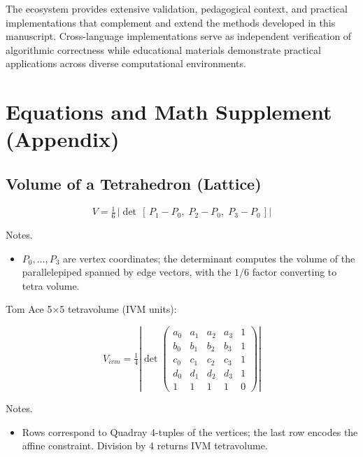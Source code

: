 \documentclass[
  10pt,
]{article}
\providecommand{\tightlist}{%
  \setlength{\itemsep}{0pt}\setlength{\parskip}{0pt}}
\begin{document}
The ecosystem provides extensive validation, pedagogical context, and
practical implementations that complement and extend the methods
developed in this manuscript. Cross-language implementations serve as
independent verification of algorithmic correctness while educational
materials demonstrate practical applications across diverse
computational environments. 

\hypertarget{equations-and-math-supplement-appendix}{%
\section{Equations and Math Supplement
(Appendix)}\label{equations-and-math-supplement-appendix}}

\hypertarget{volume-of-a-tetrahedron-lattice}{%
\subsection{Volume of a Tetrahedron
(Lattice)}\label{volume-of-a-tetrahedron-lattice}}

\begin{equation}\label{eq:supp_lattice_det}
V = \tfrac{1}{6}\,\left|\det\,[\,P_1 - P_0,\; P_2 - P_0,\; P_3 - P_0\,]\right|
\end{equation}

Notes.

\begin{itemize}
\tightlist
\item
  \(P_0,\ldots,P_3\) are vertex coordinates; the determinant computes
  the volume of the parallelepiped spanned by edge vectors, with the
  \(1/6\) factor converting to tetra volume.
\end{itemize}

Tom Ace 5×5 tetravolume (IVM units):

\begin{equation}\label{eq:supp_ace5x5}
V_{ivm} = \tfrac{1}{4} \left| \det \begin{pmatrix}
 a_0 & a_1 & a_2 & a_3 & 1 \\
 b_0 & b_1 & b_2 & b_3 & 1 \\
 c_0 & c_1 & c_2 & c_3 & 1 \\
 d_0 & d_1 & d_2 & d_3 & 1 \\
  1 & 1 & 1 & 1 & 0
\end{pmatrix} \right|
\end{equation}

Notes.

\begin{itemize}
\tightlist
\item
  Rows correspond to Quadray 4-tuples of the vertices; the last row
  encodes the affine constraint. Division by 4 returns IVM tetravolume.
\end{itemize}
\end{document}
